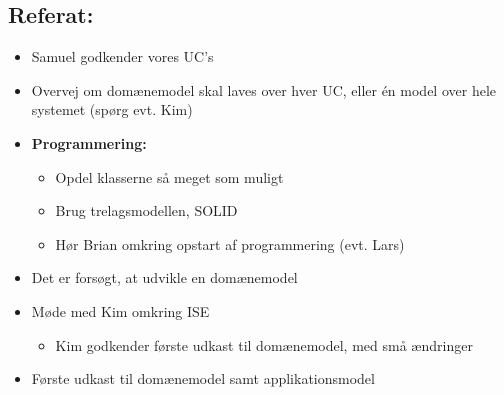 \documentclass[a4paper,11pt,oneside]{memoir}
\newcommand{\R}{\ensuremath{\mathbb{R}}}
\begin{document}
\subsection{Referat:}
\begin{itemize}
\item Samuel godkender vores UC's
\item Overvej om domænemodel skal laves over hver UC, eller én model over hele systemet (spørg evt. Kim)
\item \textbf{Programmering:}
\begin{itemize}
\item Opdel klasserne så meget som muligt
\item Brug trelagsmodellen, SOLID 
\item Hør Brian omkring opstart af programmering (evt. Lars)
\end{itemize}
\item Det er forsøgt, at udvikle en domænemodel
\item Møde med Kim omkring ISE
\begin{itemize}
\item Kim godkender første udkast til domænemodel, med små ændringer
\end{itemize}
\item Første udkast til domænemodel samt applikationsmodel
\end{itemize}


\newpage






\end{document}
